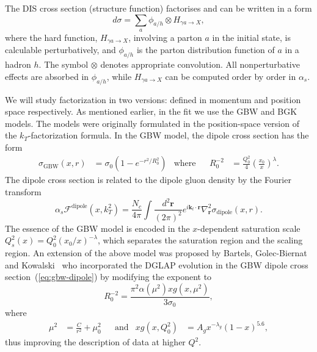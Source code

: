 \documentclass[11pt]{article}
\newcommand{\fdp}[0]{\mathcal{F}^{\mathrm{dipole}}}
\begin{document}
The DIS cross section (structure function) factorises and can be written in a
form
%
\begin{equation}
   d\sigma = \sum_{a}  \phi_{a/h} \otimes H_{\gamma a \to X} ,
\end{equation}
%
where the hard function, $H_{\gamma a \to X}$, involving a parton $a$ in the
initial state, is calculable perturbatively, and $\phi_{a/h}$ is the parton
distribution function of $a$ in a hadron $h$.  
%
The symbol $\otimes$ denotes appropriate convolution. All nonperturbative
effects are absorbed in $\phi_{a/h}$, while $H_{\gamma a \to X}$ can be computed
order by order in $\alpha_s$.  
 
We will study factorization in two versions: defined in momentum and position
space respectively.  As mentioned earlier, in the fit we use the GBW and BGK models.  The models were
originally formulated in the position-space version of the $k_T$-factorization
formula.  In the GBW model, the dipole cross section has the
form~\cite{Golec-Biernat:1998zce}
%
\begin{align}
\label{eq:gbw-dipole}
\sigma_{\mathrm{GBW}}(x,r)&=\sigma_0\left(1-e^{-r^2/R^2_0}\right)&\mathrm{where}&
&R^{-2}_0&=\frac{Q_0^{2}}{4}\left(\frac{x_0}{x}\right)^\lambda.
\end{align}
%
The dipole cross section is related to the dipole gluon density by the Fourier
transform
%
\begin{equation}
\alpha_s\fdp(x,k_T^2)=\frac{N_c}{4\pi}\int\frac{d^2\mathbf{r}}{(2\pi)^2}e^{i\mathbf{k}_t\cdot \mathbf{r} }\nabla_{\mathbf{r}}^2\sigma_{\mathrm{dipole}}(x,r).
\label{eq:dipole gluon}
\end{equation}
%
The essence of the GBW model is encoded in the $x$-dependent saturation scale
$Q_s^2(x)=Q^2_0(x_0/x)^{-\lambda}$, which separates the saturation region and
the scaling region.  An extension of the above model was proposed by Bartels, Golec-Biernat
and Kowalski~\cite{Bartels:2002cj} who incorporated the DGLAP evolution
in the GBW dipole cross section~(\ref{eq:gbw-dipole}) by modifying the exponent
to 
%
\begin{equation}
R_0^{-2}=\frac{\pi^2\alpha(\mu^2)xg(x,\mu^2)}{3\sigma_0},
\end{equation}
where
\begin{align}
\mu^2&=\frac{C}{r^2}+\mu_0^2 & &\mathrm{and} & xg(x,Q^2_0)&=A_g x^{-\lambda_g}(1-x)^{5.6},
\end{align}
%
thus improving the description of data at higher $Q^2$.\\
\end{document}
